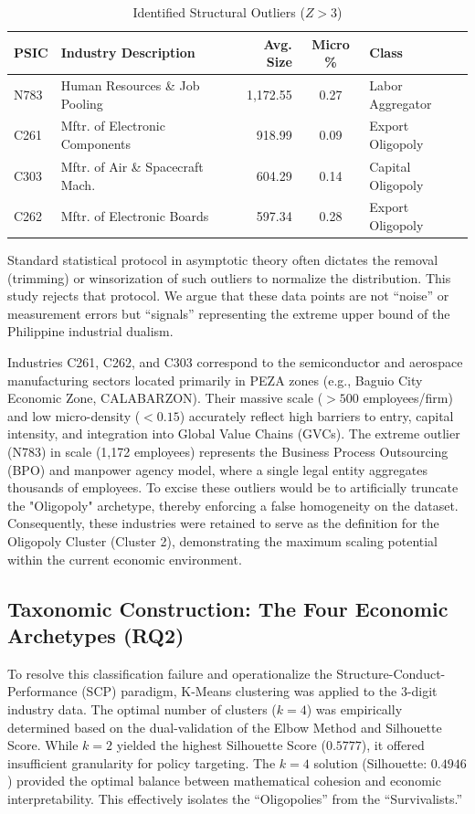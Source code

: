 \documentclass[acmtog, nonacm]{acmart}
\begin{document}
\begin{table}[ht]
  \caption{Identified Structural Outliers ($Z > 3$)}
  \label{tab:outliers}
  \small
  \begin{tabularx}{\linewidth}{l X r c l}
    \toprule
    \textbf{PSIC} & \textbf{Industry Description} & \textbf{Avg. Size} & \textbf{Micro \%} & \textbf{Class} \\
    \midrule
    N783 & Human Resources \& Job Pooling & 1,172.55 & 0.27 & Labor Aggregator \\
    C261 & Mftr. of Electronic Components & 918.99 & 0.09 & Export Oligopoly \\
    C303 & Mftr. of Air \& Spacecraft Mach. & 604.29 & 0.14 & Capital Oligopoly \\
    C262 & Mftr. of Electronic Boards & 597.34 & 0.28 & Export Oligopoly \\
    \bottomrule
  \end{tabularx}
\end{table}

Standard statistical protocol in asymptotic theory often dictates the removal (trimming) or winsorization of such outliers to normalize the distribution. This study rejects that protocol. We argue that these data points are not ``noise'' or measurement errors but ``signals'' representing the extreme upper bound of the Philippine industrial dualism.

Industries C261, C262, and C303 correspond to the semiconductor and aerospace manufacturing sectors located primarily in PEZA zones (e.g., Baguio City Economic Zone, CALABARZON). Their massive scale ($>500$ employees/firm) and low micro-density ($<0.15$) accurately reflect high barriers to entry, capital intensity, and integration into Global Value Chains (GVCs).
The extreme outlier (N783) in scale (1,172 employees) represents the Business Process Outsourcing (BPO) and manpower agency model, where a single legal entity aggregates thousands of employees.
To excise these outliers would be to artificially truncate the "Oligopoly" archetype, thereby enforcing a false homogeneity on the dataset. Consequently, these industries were retained to serve as the definition for the Oligopoly Cluster (Cluster 2), demonstrating the maximum scaling potential within the current economic environment.



\subsection{Taxonomic Construction: The Four Economic Archetypes (RQ2)}
To resolve this classification failure and operationalize the Structure-Conduct-Performance (SCP) paradigm, K-Means clustering was applied to the 3-digit industry data. The optimal number of clusters ($k=4$) was empirically determined based on the dual-validation of the Elbow Method and Silhouette Score. While $k=2$ yielded the highest Silhouette Score ($0.5777$), it offered insufficient granularity for policy targeting. The $k=4$ solution (Silhouette: $0.4946$) provided the optimal balance between mathematical cohesion and economic interpretability. This effectively isolates the ``Oligopolies'' from the ``Survivalists.''
\end{document}
